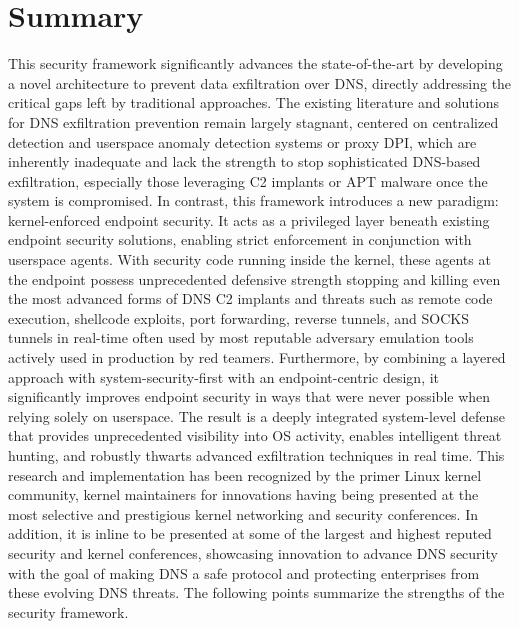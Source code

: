 \documentclass [11pt, proquest] {uwthesis}[2020/02/24]
\begin{document}
\section{Summary}
This security framework significantly advances the state-of-the-art by developing a novel architecture to prevent data exfiltration over DNS, directly addressing the critical gaps left by traditional approaches. The existing literature and solutions for DNS exfiltration prevention remain largely stagnant, centered on centralized detection and userspace anomaly detection systems or proxy DPI, which are inherently inadequate and lack the strength to stop sophisticated DNS-based exfiltration, especially those leveraging C2 implants or APT malware once the system is compromised. In contrast, this framework introduces a new paradigm: kernel-enforced endpoint security. It acts as a privileged layer beneath existing endpoint security solutions, enabling strict enforcement in conjunction with userspace agents. With security code running inside the kernel, these agents at the endpoint possess unprecedented defensive strength stopping and killing even the most advanced forms of DNS C2 implants and threats such as remote code execution, shellcode exploits, port forwarding, reverse tunnels, and SOCKS tunnels in real-time often used by most reputable adversary emulation tools actively used in production by red teamers.
Furthermore, by combining a layered approach with system-security-first with an endpoint-centric design, it significantly improves endpoint security in ways that were never possible when relying solely on userspace. The result is a deeply integrated system-level defense that provides unprecedented visibility into OS activity, enables intelligent threat hunting, and robustly thwarts advanced exfiltration techniques in real time. This research and implementation has been recognized by the primer Linux kernel community, kernel maintainers for innovations having being presented at the most selective and prestigious kernel networking and security conferences. In addition, it is inline to be presented at some of the largest and highest reputed security and kernel conferences, showcasing innovation to advance DNS security with the goal of making DNS a safe protocol and protecting enterprises from these evolving DNS threats. The following points summarize the strengths of the security framework.
\end{document}
